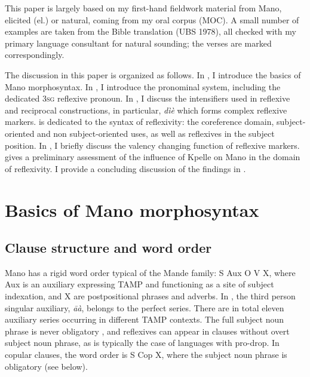 \documentclass[output=paper]{langscibook}
\begin{document}
This paper is largely based on my first-hand fieldwork material from Mano, elicited (el.) or natural, coming from my oral corpus (MOC). A small number of examples are taken from the Bible translation (UBS 1978), all checked with my primary language consultant for natural sounding; the verses are marked correspondingly.

The discussion in this paper is organized as follows. In , I introduce the basics of Mano morphosyntax. In , I introduce the pronominal system, including the dedicated 3\textsc{sg} reflexive pronoun. In , I discuss the intensifiers used in reflexive and reciprocal constructions, in particular, \textit{dìè} which forms complex reflexive markers.  is dedicated to the syntax of reflexivity: the coreference domain, subject-oriented and non subject-oriented uses, as well as reflexives in the subject position. In , I briefly discuss the valency changing function of reflexive markers.  gives a preliminary assessment of the influence of Kpelle on Mano in the domain of reflexivity. I provide a concluding discussion of the findings in .


\section{Basics of Mano morphosyntax}\label{sec:Kachaturyan:2}

\subsection{Clause structure and word order}\label{sec:Kachaturyan:2.1}

Mano has a rigid word order typical of the Mande family: S Aux O V X, where Aux is an auxiliary expressing TAMP and functioning as a site of subject indexation, and X are postpositional phrases and adverbs. In , the third person singular auxiliary, \textit{āà}, belongs to the perfect series. There are in total eleven auxiliary series occurring in different TAMP contexts. The full subject noun phrase is never obligatory , and reflexives can appear in clauses without overt subject noun phrase, as is typically the case of languages with pro-drop. In copular clauses, the word order is S Cop X, where the subject noun phrase is obligatory (see  below).
\end{document}
